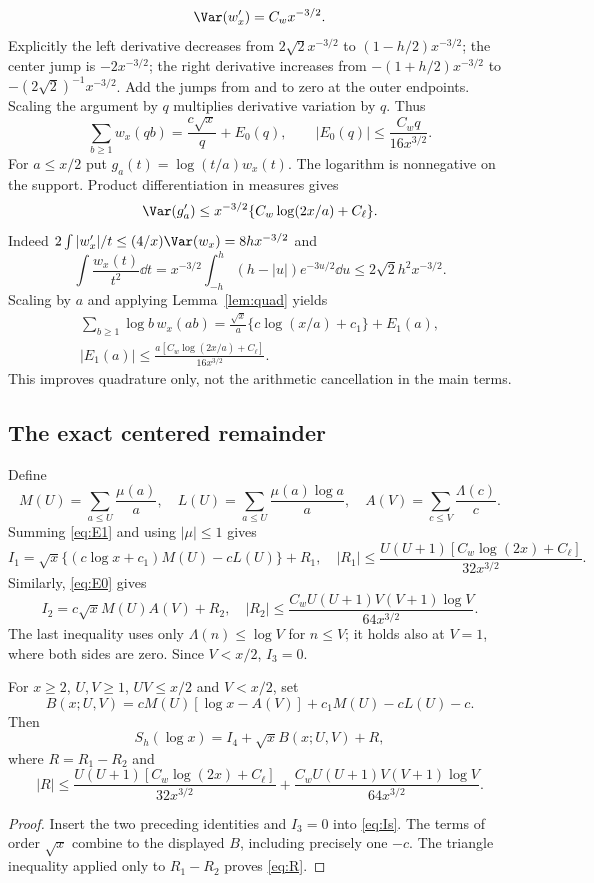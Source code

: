\[
\Var(w_x')=C_wx^{-3/2}.
\]
Explicitly the left derivative decreases from $2\sqrt2x^{-3/2}$ to $(1-h/2)x^{-3/2}$; the center jump is $-2x^{-3/2}$; the right derivative increases from $-(1+h/2)x^{-3/2}$ to $-(2\sqrt2)^{-1}x^{-3/2}$. Add the jumps from and to zero at the outer endpoints. Scaling the argument by $q$ multiplies derivative variation by $q$. Thus
\begin{equation}\label{eq:E0}
\sum_{b\ge1}w_x(qb)=\frac{c\sqrt x}{q}+E_0(q),\qquad
|E_0(q)|\le\frac{C_wq}{16x^{3/2}}.
\end{equation}
For $a\le x/2$ put $g_a(t)=\log(t/a)w_x(t)$. The logarithm is nonnegative on the support. Product differentiation in measures gives
\[
\Var(g_a')\le x^{-3/2}\{C_w\log(2x/a)+C_\ell\}.
\]
Indeed $2\int|w_x'|/t\le(4/x)\Var(w_x)=8hx^{-3/2}$ and
\[
\int\frac{w_x(t)}{t^2}\dd t
=x^{-3/2}\int_{-h}^h(h-|u|)e^{-3u/2}\dd u\le2\sqrt2h^2x^{-3/2}.
\]
Scaling by $a$ and applying Lemma~\ref{lem:quad} yields
\begin{equation}\label{eq:E1}
\begin{gathered}
\sum_{b\ge1}\log b\,w_x(ab)=\frac{\sqrt x}{a}\{c\log(x/a)+c_1\}+E_1(a),\\
|E_1(a)|\le\frac{a[C_w\log(2x/a)+C_\ell]}{16x^{3/2}}.
\end{gathered}
\end{equation}
This improves quadrature only, not the arithmetic cancellation in the main terms.

\subsection{The exact centered remainder}
Define
\[
M(U)=\sum_{a\le U}\frac{\mu(a)}a,\quad
L(U)=\sum_{a\le U}\frac{\mu(a)\log a}a,\quad
A(V)=\sum_{c\le V}\frac{\Lambda(c)}c.
\]
Summing \eqref{eq:E1} and using $|\mu|\le1$ gives
\[
I_1=\sqrt x\{(c\log x+c_1)M(U)-cL(U)\}+R_1,
\quad |R_1|\le\frac{U(U+1)[C_w\log(2x)+C_\ell]}{32x^{3/2}}.
\]
Similarly, \eqref{eq:E0} gives
\[
I_2=c\sqrt xM(U)A(V)+R_2,\quad
|R_2|\le\frac{C_wU(U+1)V(V+1)\log V}{64x^{3/2}}.
\]
The last inequality uses only $\Lambda(n)\le\log V$ for $n\le V$; it holds also at $V=1$, where both sides are zero. Since $V<x/2$, $I_3=0$.
\begin{theorem}\label{thm:centered}
For $x\ge2$, $U,V\ge1$, $UV\le x/2$ and $V<x/2$, set
\[
B(x;U,V)=cM(U)[\log x-A(V)]+c_1M(U)-cL(U)-c.
\]
Then
\begin{equation}\label{eq:centered}
S_h(\log x)=I_4+\sqrt x B(x;U,V)+R,
\end{equation}
where $R=R_1-R_2$ and
\begin{equation}\label{eq:R}
|R|\le\frac{U(U+1)[C_w\log(2x)+C_\ell]}{32x^{3/2}}+\frac{C_wU(U+1)V(V+1)\log V}{64x^{3/2}}.
\end{equation}
\end{theorem}
\begin{proof}
Insert the two preceding identities and $I_3=0$ into \eqref{eq:Is}. The terms of order $\sqrt x$ combine to the displayed $B$, including precisely one $-c$. The triangle inequality applied only to $R_1-R_2$ proves \eqref{eq:R}.
\end{proof}

